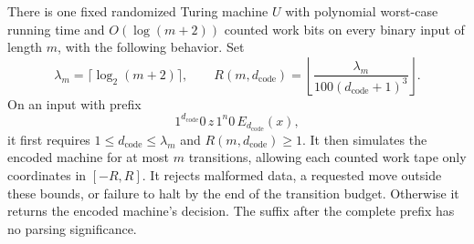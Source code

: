 \begin{lemma}
\label{lem:compiler-interpreter}
There is one fixed randomized Turing machine $U$ with polynomial
worst-case running time and $O(\log(m+2))$ counted work bits on every
binary input of length $m$, with the following behavior.
Set
\begin{equation}\label{eq:compiler-interpreter-cap}
 \lambda_m=\lceil\log_2(m+2)\rceil,
 \qquad
 R(m,d_{\mathrm{code}})
   =\left\lfloor\frac{\lambda_m}
       {100(d_{\mathrm{code}}+1)^3}\right\rfloor.
\end{equation}
On an input with prefix
\begin{equation}\label{eq:compiler-prefix}
  1^{d_{\mathrm{code}}}0\,z\,1^n0\,
  E_{d_{\mathrm{code}}}(x),
\end{equation}
it first requires $1\le d_{\mathrm{code}}\le\lambda_m$ and
$R(m,d_{\mathrm{code}})\ge1$.  It then simulates the encoded machine
for at most $m$ transitions, allowing each counted work tape only
coordinates in $[-R,R]$.  It rejects malformed data, a requested move
outside these bounds, or failure to halt by the end of the transition
budget.  Otherwise it returns the encoded machine's decision.  The
suffix after the complete prefix has no parsing significance.
\end{lemma}


